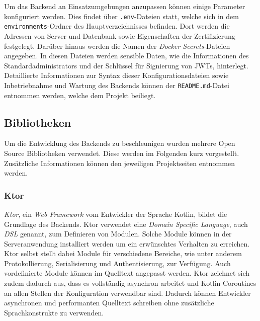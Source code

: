 \documentclass[a4paper, 11pt]{article}
\begin{document}
Um das Backend an Einsatzumgebungen anzupassen können einige Parameter konfiguriert werden.
Dies findet über \verb|.env|-Dateien statt, welche sich in dem \verb|environments|-Ordner des Hauptverzeichnisses befinden.
Dort werden die Adressen von Server und Datenbank sowie Eigenschaften der Zertifizierung festgelegt.
Darüber hinaus werden die Namen der \textit{Docker Secrets}-Dateien angegeben.
In diesen Dateien werden sensible Daten, wie die Informationen des Standardadministrators und der Schlüssel für Signierung von JWTs, hinterlegt.
Detaillierte Informationen zur Syntax dieser Konfigurationsdateien sowie Inbetriebnahme und Wartung des Backends können der \verb|README.md|-Datei entnommen werden, welche dem Projekt beiliegt.

\subsection{Bibliotheken}
\label{subsec:backend:bibs}

Um die Entwicklung des Backends zu beschleunigen wurden mehrere Open Source Bibliotheken verwendet.
Diese werden im Folgenden kurz vorgestellt.
Zusätzliche Informationen können den jeweiligen Projektseiten entnommen werden.

\subsubsection{Ktor}
\label{subsubsec:backend:bibs:ktor}

\textit{Ktor}, ein \textit{Web Framework} vom Entwickler der Sprache Kotlin, bildet die Grundlage des Backends.
Ktor verwendet eine \textit{Domain Specific Language}, auch \textit{DSL} genannt, zum Definieren von Modulen.
Solche Module können in der Serveranwendung installiert werden um ein erwünschtes Verhalten zu erreichen.
Ktor selbst stellt dabei Module für verschiedene Bereiche, wie unter anderem Protokollierung, Serialisierung und Authentisierung, zur Verfügung.
Auch vordefinierte Module können im Quelltext angepasst werden.
Ktor zeichnet sich zudem dadurch aus, dass es vollständig asynchron arbeitet und Kotlin Coroutines an allen Stellen der Konfiguration verwendbar sind.
Dadurch können Entwickler asynchronen und performanten Quelltext schreiben ohne zusätzliche Sprachkonstrukte zu verwenden.
\end{document}
